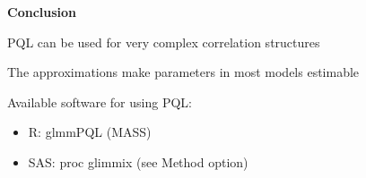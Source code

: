 \documentclass[mathserif, 10pt, t]{beamer}
\renewcommand{\subtitle}[1]{\vspace{0.45cm}\textcolor{bluegreen}{
    {\textbf{#1}}}\vspace{0.15cm}\newline}
\begin{document}
\begin{frame}
\subtitle{Conclusion}

PQL can be used for very complex correlation structures
\bigskip

The approximations make parameters in most models estimable
\bigskip

Available software for using PQL:
\begin{itemize}[label=${\cdot}$]
\item R: glmmPQL (MASS)
\item SAS: proc glimmix (see Method option)
\end{itemize}

\end{frame}
\end{document}
